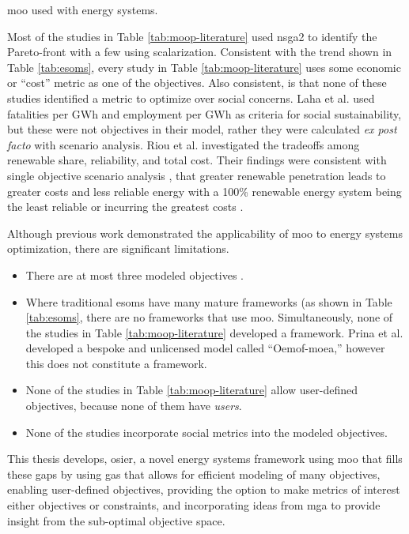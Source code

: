 \begin{table}[ht!]
    \centering
    \caption{\ac{moo} used with energy systems.}
    \label{tab:moop-literature}
\end{table}
Most of the studies in Table \ref{tab:moop-literature} used \ac{nsga2} to identify
the Pareto-front with a few using scalarization.
Consistent with the trend shown in Table \ref{tab:esoms}, every study in Table 
\ref{tab:moop-literature} uses some economic or ``cost'' metric as one of the 
objectives. Also consistent, is that none of these studies identified a metric to 
optimize over social concerns. Laha et al. \cite{laha_low_2021} used fatalities per 
GWh and employment per GWh as criteria for social sustainability, but these were not
objectives in their model, rather they were calculated \textit{ex post facto}
with scenario analysis. Riou et al. \cite{riou_multi-objective_2021} investigated
the tradeoffs among renewable share, reliability, and total cost. Their findings were
consistent with single objective scenario analysis \cite{de_sisternes_value_2016},
that greater renewable penetration leads to greater costs and less reliable energy 
with a 100\% renewable energy system being the least reliable or incurring the 
greatest costs \cite{riou_multi-objective_2021}. 

Although previous work demonstrated the applicability of \ac{moo} to energy systems
optimization, there are significant limitations. 
\begin{itemize}
    \item{There are at most three modeled objectives \cite{riou_multi-objective_2021,de-leon_almaraz_deployment_2015, de-leon_almaraz_assessment_2013}.}
    \item{Where traditional \acp{esom} have many mature frameworks (as shown in Table \ref{tab:esoms}, there are no frameworks that use \ac{moo}. Simultaneously, none of the studies in Table \ref{tab:moop-literature} developed a framework. Prina et al. developed a bespoke and unlicensed model called ``Oemof-moea,'' however this does not constitute a framework.}
    \item{None of the studies in Table \ref{tab:moop-literature} allow user-defined objectives, because none of them have \textit{users}.}
    \item{None of the studies incorporate social metrics into the modeled objectives.}
\end{itemize}

This thesis develops, \ac{osier}, a novel energy systems framework using \ac{moo} 
that fills these gaps by using \acp{ga} that allows for efficient modeling of many 
objectives, enabling user-defined objectives, providing the option to make metrics 
of interest either objectives or constraints, and incorporating ideas from \ac{mga} 
to provide insight from the sub-optimal objective space.


